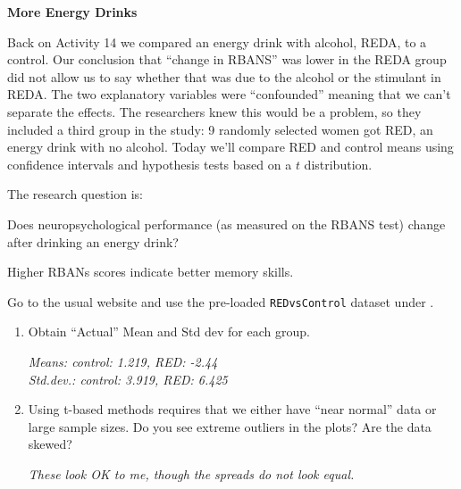 \def\theTopic{Energy Drinks II}
\def\dayNum{25 }

\begin{center}
{\bf {\large \textbf{More Energy Drinks}}}
\end{center}

Back on Activity 14 we compared an energy drink with
alcohol, REDA, to a control.  Our conclusion that ``change in RBANS''
was lower in the REDA group did not allow us to say whether that was
due to the alcohol 
or the stimulant in REDA.  The two  explanatory variables were
``confounded'' meaning that we can't separate the effects.  The
researchers knew this would be a problem, so they included a third
group in the study: 9 randomly selected women got RED, an energy drink
with no alcohol.  Today we'll compare RED and control means using
confidence intervals and hypothesis tests based on a $t$
distribution. 

  The research question is: 

  {\sf
    Does neuropsychological performance (as measured on the RBANS
    test) change after drinking an energy drink? }

   Higher RBANs scores indicate better memory skills.

 Go to the usual website and use the pre-loaded {\tt REDvsControl}
 dataset under .

  \begin{enumerate}
  \item  Obtain ``Actual'' Mean and Std dev for each group. 
\begin{students}
    \vspace{4cm}    
\end{students}

\begin{key}
  {\it Means:  control: 1.219, RED: -2.44 \\%
       Std.dev.: control: 3.919, RED: 6.425}%
\end{key}

\item Using t-based methods requires that we either have ``near
  normal'' data or  large sample sizes.  Do you see extreme outliers
  in the plots?  Are the data skewed?

\begin{students}
    \vspace{2cm}    
\end{students}

\begin{key}
  {\it  These look OK to me, though the spreads do not look equal.}
\end{key}

\end{enumerate}


